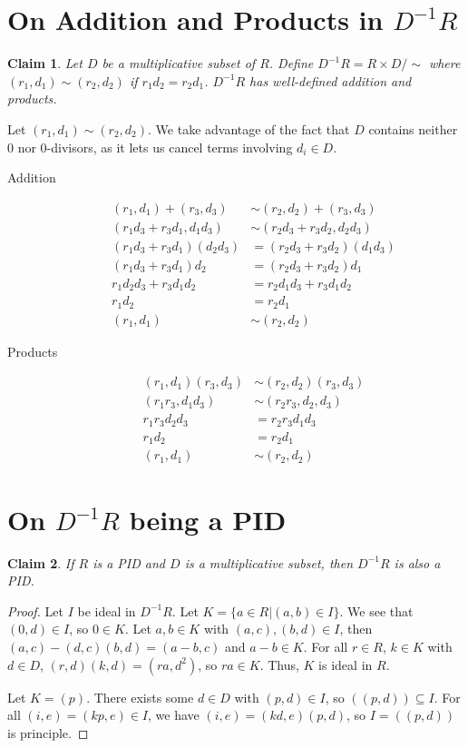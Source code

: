 \documentclass[12pt]{article}
\newtheorem*{claim*}{Claim}
\newcommand*{\inv}{^{-1}}
\begin{document}
\section{On Addition and Products in $D\inv R$}
\begin{claim*}
Let $D$ be a multiplicative subset of $R$. Define $D\inv R = R \times D / \sim$ where $(r_1, d_1) \sim (r_2, d_2)$ if $r_1 d_2 = r_2 d_1$. $D\inv R$ has well-defined addition and products.
\end{claim*}
Let $(r_1, d_1) \sim (r_2, d_2)$. We take advantage of the fact that $D$ contains neither 0 nor 0-divisors, as it lets us cancel terms involving $d_i \in D$.
\begin{description}
\item[Addition]
\begin{align*}
(r_1, d_1) + (r_3, d_3) &\sim (r_2, d_2) + (r_3, d_3)\\
(r_1 d_3 + r_3 d_1, d_1 d_3) &\sim (r_2 d_3 + r_3 d_2, d_2 d_3)\\
(r_1 d_3 + r_3 d_1)(d_2 d_3) &= (r_2 d_3 + r_3 d_2)(d_1 d_3)\\
(r_1 d_3 + r_3 d_1)d_2 &= (r_2 d_3 + r_3 d_2)d_1\\
r_1 d_2 d_3 + r_3 d_1 d_2 &= r_2 d_1 d_3 + r_3 d_1 d_2\\
r_1 d_2&= r_2 d_1\\
(r_1, d_1) &\sim (r_2, d_2)
\end{align*}

\item[Products]
\begin{align*}
(r_1, d_1)(r_3, d_3) &\sim (r_2, d_2)(r_3, d_3)\\
(r_1 r_3, d_1 d_3) &\sim (r_2 r_3, d_2, d_3)\\
r_1 r_3 d_2 d_3 &= r_2 r_3 d_1 d_3\\
r_1 d_2 &= r_2 d_1\\
(r_1, d_1) &\sim (r_2, d_2)
\end{align*}
\end{description}

\section{On $D\inv R$ being a PID}
\begin{claim*}
If $R$ is a PID and $D$ is a multiplicative subset, then $D\inv R$ is also a PID.
\end{claim*}
\begin{proof}
Let $I$ be ideal in $D\inv R$. Let $K = \{a \in R | (a,b) \in I\}$. We see that $(0, d) \in I$, so $0 \in K$. Let $a, b \in K$ with $(a, c), (b, d) \in I$, then $(a, c) - (d, c) (b, d) = (a - b, c)$ and $a - b \in K$. For all $r \in R$, $k \in K$ with $d \in D$, $(r,d)(k,d) = (ra, d^2)$, so $ra \in K$. Thus, $K$ is ideal in $R$.

Let $K = (p)$. There exists some $d \in D$ with $(p, d) \in I$, so $((p, d)) \subseteq I$. For all $(i, e) = (kp, e) \in I$, we have $(i, e) = (kd, e)(p, d)$, so $I = ((p, d))$ is principle.
\end{proof}
\end{document}

